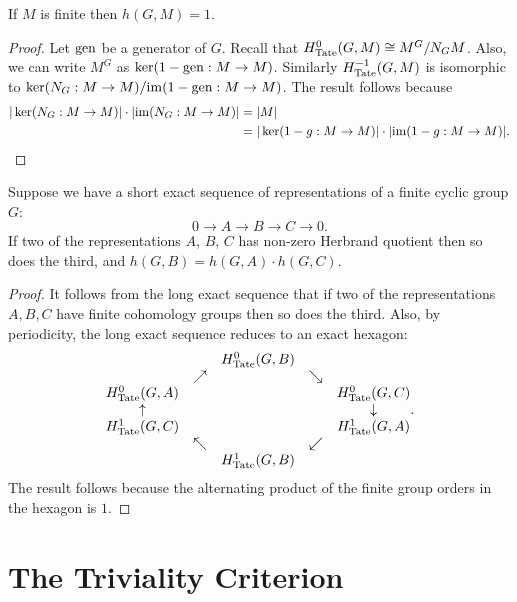 \begin{lemma} \label{lem:herbrand finite}
	If $M$ is finite then $h(G,M)=1$.
\end{lemma}

\begin{proof}
	Let $\mathrm{gen}$ be a generator of $G$.
	Recall that $H^0_{\mathrm{Tate}}(G,M) \cong M^G / N_GM$.
	Also, we can write $M^G$ as $\ker(1-\mathrm{gen} : M \to M)$.
	Similarly $H^{-1}_{\mathrm{Tate}}(G,M)$ is isomorphic to $\ker (N_G : M \to M) / \mathrm{im} (1-\mathrm{gen} : M \to M)$.
	The result follows because
	\begin{align*}
		|\ker(N_G : M \to M)| \cdot |\mathrm{im}(N_G : M \to M)|
		&=|M|\\
		&=|\ker(1-g : M \to M)| \cdot |\mathrm{im}(1-g : M \to M)|.
	\end{align*}
\end{proof}

\begin{lemma} \label{lem:herbrand ses}
	Suppose we have a short exact sequence of representations of a finite cyclic group $G$:
	\[
		0 \to A \to B \to C \to 0.
	\]
	If two of the representations $A$, $B$, $C$ has non-zero Herbrand quotient then so
	does the third, and $h(G,B) = h(G,A) \cdot h(G,C)$.
\end{lemma}

\begin{proof}
	It follows from the long exact sequence that if two of the representations $A,B,C$
	have finite cohomology groups then so does the third.
	Also, by periodicity, the long exact sequence reduces to an exact hexagon:
	\[
		\begin{matrix}
			&& H^0_{\mathrm{Tate}}(G,B) \\
			&\nearrow && \searrow \\
			H^0_{\mathrm{Tate}}(G,A)  && && H^0_{\mathrm{Tate}}(G,C) \\
			\uparrow & & & & \downarrow \\
			H^1_{\mathrm{Tate}}(G,C) &&&& H^1_{\mathrm{Tate}}(G,A) \\
			& \nwarrow && \swarrow\\
			&& H^1_{\mathrm{Tate}}(G,B)
		\end{matrix}.
	\]
	The result follows because the alternating product of the
	finite group orders in the hexagon is $1$.
\end{proof}



\section{The Triviality Criterion}

